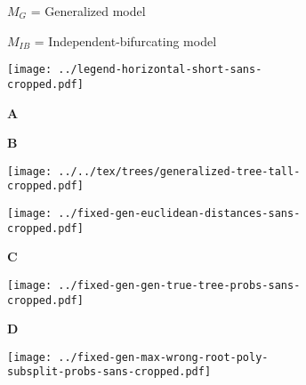 \documentclass[border=10pt,varwidth=30cm]{standalone}
\begin{document}
\begin{figure}
    \centering
    \begin{subfigure}[c][][c]{0.49\textwidth}
        \centering
        \Huge $M_{G}$ = Generalized model
    \end{subfigure}
    \hfill
    \begin{subfigure}[c][][c]{0.49\textwidth}
        \centering
        \Huge $M_{IB}$ = Independent-bifurcating model
    \end{subfigure}
    \vspace{2mm}
    \begin{subfigure}[c][][c]{\textwidth}
        \centering
        \texttt{[image: ../legend-horizontal-short-sans-cropped.pdf]}
    \end{subfigure}
    \vspace{2mm}
    \begin{subfigure}[b][][l]{0.39\textwidth}
        \huge \textbf{A}
    \end{subfigure}
    \hfill
    \begin{subfigure}[b][][l]{0.59\textwidth}
        \huge \textbf{B}
    \end{subfigure}
    \vspace{2mm}
    \begin{subfigure}[c][][c]{0.39\textwidth}
        \centering
        \texttt{[image: ../../tex/trees/generalized-tree-tall-cropped.pdf]}
        \label{fig:gentree}
    \end{subfigure}
    \hfill
    \begin{subfigure}[c][][c]{0.59\textwidth}
        \centering
        \texttt{[image: ../fixed-gen-euclidean-distances-sans-cropped.pdf]}
    \end{subfigure}
    \begin{subfigure}[b][][l]{\textwidth}
        \huge \textbf{C}
    \end{subfigure}
    \begin{subfigure}[c][][c]{\textwidth}
        \centering
        \texttt{[image: ../fixed-gen-gen-true-tree-probs-sans-cropped.pdf]}
    \end{subfigure}
    \begin{subfigure}[b][][l]{\textwidth}
        \huge \textbf{D}
    \end{subfigure}
    \begin{subfigure}[c][][c]{\textwidth}
        \centering
        \texttt{[image: ../fixed-gen-max-wrong-root-poly-subsplit-probs-sans-cropped.pdf]}
    \end{subfigure}
\end{figure}
\end{document}
